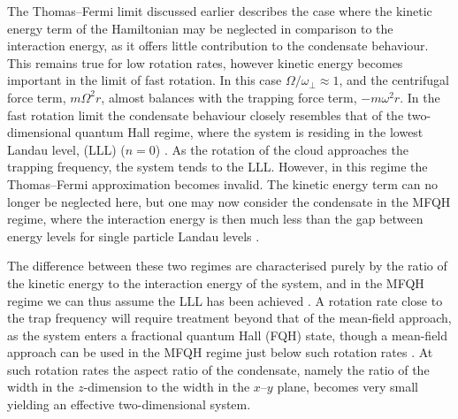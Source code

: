 

The Thomas--Fermi limit discussed earlier describes the case where the kinetic energy term of the Hamiltonian may be neglected in comparison to the interaction energy, as it offers little contribution to the condensate behaviour. This remains true for low rotation rates, however kinetic energy becomes important in the limit of fast rotation. In this case $\Omega/\omega_{\perp}\approx 1$, and the centrifugal force term, $m\Omega^2r$, almost balances with the trapping force term, $-m\omega^2r$. In the fast rotation limit the condensate behaviour closely resembles that of the two-dimensional quantum Hall regime, where the system is residing in the lowest Landau level, (LLL) ($n=0$) \cite{Vtx:Ho_prl_2001}. As the rotation of the cloud approaches the trapping frequency, the system tends to the LLL. However, in this regime the Thomas--Fermi approximation becomes invalid. The kinetic energy term can no longer be neglected here, but one may now consider the condensate in the MFQH regime, where the interaction energy is then much less than the gap between energy levels for single particle Landau levels \cite{Vtx:Ho_prl_2001}.

The difference between these two regimes are characterised purely by the ratio of the kinetic energy to the interaction energy of the system, and in the MFQH regime we can thus assume the LLL has been achieved \cite{Vtx:Zhai_pra_2004}. A rotation rate close to the trap frequency will require treatment beyond that of the mean-field approach, as the system enters a fractional quantum Hall (FQH) state, though a mean-field approach can be used in the MFQH regime just below such rotation rates \cite{Fetter_rmp_2009}. At such rotation rates the aspect ratio of the condensate, namely the ratio of the width in the $z$-dimension to the width in the $x$--$y$ plane, becomes very small yielding an effective two-dimensional system.

